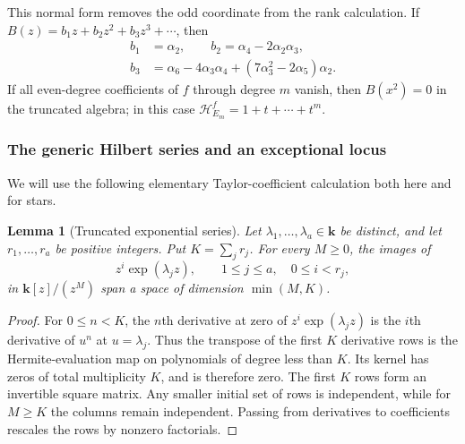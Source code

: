 \documentclass[reqno]{article}
\theoremstyle{plain} %
\newtheorem{lemma}[theorem]{Lemma}
\theoremstyle{definition}
\theoremstyle{remark}
\newcommand{\K} {\mathbf{k}}
\newcommand{\hs}{\mathscr{H}}
\numberwithin{equation}{section}
\begin{document}
This normal form removes the odd coordinate from the rank calculation.
If $B(z)=b_1z+b_2z^2+b_3z^3+\cdots$, then
\begin{equation}\label{eq:parallel-jet-coefficients}
\begin{split}
 b_1&=\alpha_2,\qquad b_2=\alpha_4-2\alpha_2\alpha_3,\\
 b_3&=\alpha_6-4\alpha_3\alpha_4
             +(7\alpha_3^2-2\alpha_5)\alpha_2.
\end{split}
\end{equation}
If all even-degree coefficients of $f$ through degree $m$ vanish, then $B(x^2)=0$
in the truncated algebra; in this case
$\hs_{E_m}^f=1+t+\cdots+t^m$.

\subsubsection{The generic Hilbert series and an exceptional locus}

We will use the following elementary Taylor-coefficient calculation
both here and for stars.
\begin{lemma}[Truncated exponential series]
\label{lem:exponential-jets}
Let $\lambda_1,\ldots,\lambda_a\in\K$ be distinct, and let
$r_1,\ldots,r_a$ be positive integers. Put $K=\sum_jr_j$.
For every $M\ge0$, the images of
\[
 z^i\exp(\lambda_jz),\qquad 1\le j\le a,\quad 0\le i<r_j,
\]
in $\K[z]/(z^M)$ span a space of dimension $\min(M,K)$.
\end{lemma}
\begin{proof}
For $0\le n<K$, the $n$th derivative at zero of
$z^i\exp(\lambda_jz)$ is the $i$th derivative of $u^n$ at
$u=\lambda_j$. Thus the transpose of the first $K$ derivative rows is
the Hermite-evaluation map on polynomials of degree less than $K$.
Its kernel has zeros of total multiplicity $K$, and is therefore zero.
The first $K$ rows form an invertible square matrix. Any smaller initial
set of rows is independent, while for $M\ge K$ the columns remain
independent. Passing from derivatives to coefficients rescales the rows
by nonzero factorials.
\end{proof}
\end{document}
